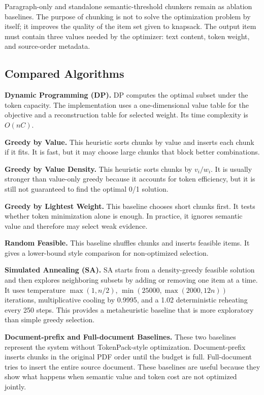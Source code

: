 \documentclass[conference]{IEEEtran}
\begin{document}
Paragraph-only and standalone semantic-threshold chunkers remain as ablation baselines. The purpose of chunking is not to solve the optimization problem by itself; it improves the quality of the item set given to knapsack. The output item must contain three values needed by the optimizer: text content, token weight, and source-order metadata.

\subsection{Compared Algorithms}
\textbf{Dynamic Programming (DP).} DP computes the optimal subset under the token capacity. The implementation uses a one-dimensional value table for the objective and a reconstruction table for selected weight. Its time complexity is $O(nC)$.

\textbf{Greedy by Value.} This heuristic sorts chunks by value and inserts each chunk if it fits. It is fast, but it may choose large chunks that block better combinations.

\textbf{Greedy by Value Density.} This heuristic sorts chunks by $v_i/w_i$. It is usually stronger than value-only greedy because it accounts for token efficiency, but it is still not guaranteed to find the optimal 0/1 solution.

\textbf{Greedy by Lightest Weight.} This baseline chooses short chunks first. It tests whether token minimization alone is enough. In practice, it ignores semantic value and therefore may select weak evidence.

\textbf{Random Feasible.} This baseline shuffles chunks and inserts feasible items. It gives a lower-bound style comparison for non-optimized selection.

\textbf{Simulated Annealing (SA).} SA starts from a density-greedy feasible solution and then explores neighboring subsets by adding or removing one item at a time. It uses temperature $\max(1,n/2)$, $\min(25000,\max(2000,12n))$ iterations, multiplicative cooling by 0.9995, and a 1.02 deterministic reheating every 250 steps. This provides a metaheuristic baseline that is more exploratory than simple greedy selection.

\textbf{Document-prefix and Full-document Baselines.} These two baselines represent the system without TokenPack-style optimization. Document-prefix inserts chunks in the original PDF order until the budget is full. Full-document tries to insert the entire source document. These baselines are useful because they show what happens when semantic value and token cost are not optimized jointly.
\end{document}
